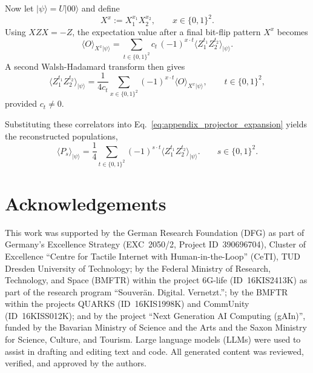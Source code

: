 \documentclass[conference]{IEEEtran}
\begin{document}
\begin{appendices}
Now let \(|\psi\rangle = U|00\rangle\) and define
\begin{equation}
X^x := X_1^{x_1}X_2^{x_2}, \qquad x\in\{0,1\}^2.
\end{equation}
Using \(XZX=-Z\), the expectation value after a final bit-flip pattern \(X^x\)
becomes
\begin{equation}
\langle O\rangle_{X^x|\psi\rangle}
=
\sum_{t\in\{0,1\}^2}
c_t\,(-1)^{x\cdot t}
\langle Z_1^{t_1}Z_2^{t_2}\rangle_{|\psi\rangle}.
\label{eq:appendix_O_shifted}
\end{equation}
A second Walsh-Hadamard transform then gives
\begin{equation}
\langle Z_1^{t_1}Z_2^{t_2}\rangle_{|\psi\rangle}
=
\frac{1}{4c_t}
\sum_{x\in\{0,1\}^2}
(-1)^{x\cdot t}
\langle O\rangle_{X^x|\psi\rangle},
\qquad t\in\{0,1\}^2,
\label{eq:appendix_Z_reconstruction}
\end{equation}
provided \(c_t\neq 0\).

Substituting these correlators into Eq.~\eqref{eq:appendix_projector_expansion}
yields the reconstructed populations,
\begin{equation}
\langle P_s\rangle_{|\psi\rangle}
=
\frac{1}{4}
\sum_{t\in\{0,1\}^2}
(-1)^{s\cdot t}
\langle Z_1^{t_1}Z_2^{t_2}\rangle_{|\psi\rangle}.
\qquad s\in\{0,1\}^2.
\label{eq:appendix_population_reconstruction}
\end{equation}

\end{appendices}


\section{Acknowledgements}
This work was supported by the German Research Foundation (DFG) as part of
Germany's Excellence Strategy (EXC~2050/2, Project ID~390696704), Cluster of
Excellence ``Centre for Tactile Internet with Human-in-the-Loop'' (CeTI), TUD
Dresden University of Technology; by the Federal Ministry of Research,
Technology, and Space (BMFTR) within the project 6G-life (ID~16KIS2413K) as part
of the research program ``Souverän. Digital. Vernetzt.''; by the BMFTR within
the projects QUARKS (ID~16KIS1998K) and CommUnity (ID~16KISS012K); and by the
project ``Next Generation AI Computing (gAIn)'', funded by the Bavarian Ministry
of Science and the Arts and the Saxon Ministry for Science, Culture, and
Tourism. Large language models (LLMs) were used to assist in drafting and
editing text and code. All generated content was reviewed, verified, and
approved by the authors.

%
%

\end{document}
